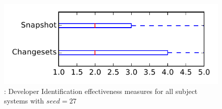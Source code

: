
\begin{figure}
\centering
\includegraphics[height=0.4\textheight]{figures/dit_seed/rq1_tiny_27}
\caption{\rtwo: Developer Identification effectiveness measures for all subject systems with $seed=27$}
\label{fig:dit_seed:rq1:tiny}
\end{figure}
